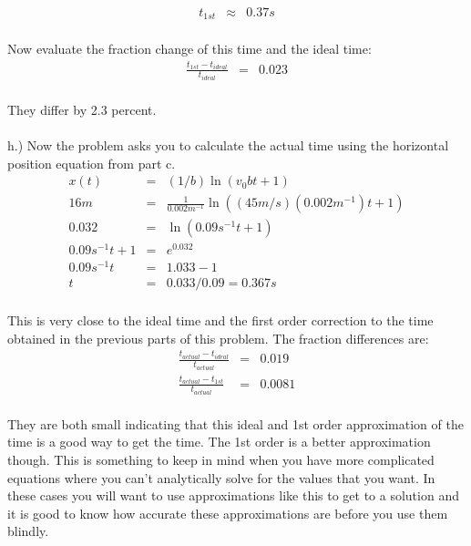 \documentclass[11pt]{amsart}
\begin{document}
\begin{eqnarray*}
t_{1st} &\approx& 0.37 s 
\end{eqnarray*} \\ 
Now evaluate the fraction change of this time and the ideal time: \\ 
\begin{eqnarray*}
\frac{t_{1st}-t_{ideal}}{t_{ideal}} &=& 0.023 
\end{eqnarray*} \\
They differ by 2.3 percent. \\ \\
h.) Now the problem asks you to calculate the actual time using the horizontal position equation from part c. \\ 
\begin{eqnarray*} 
x(t) &=& (1/b) \ln(v_{0}bt+1) \\
16m &=& \frac{1}{0.002m^{-1}}\ln((45m/s)(0.002m^{-1})t+1) \\
0.032 &=&  \ln(0.09s^{-1}t+1) \\
0.09s^{-1}t+1 &=& e^{0.032} \\
0.09s^{-1}t &=& 1.033 - 1 \\
t &=& 0.033/0.09 = 0.367s
\end{eqnarray*} \\
This is very close to the ideal time and the first order correction to the time obtained in the previous parts of this problem. The fraction differences are: \\ 
\begin{eqnarray*}
\frac{t_{actual}-t_{ideal}}{t_{actual}} &=& 0.019 \\
\frac{t_{actual}-t_{1st}}{t_{actual}} &=& 0.0081 
\end{eqnarray*} \\
They are both small indicating that this ideal and 1st order approximation of the time is a good way to get the time. The 1st order is a better approximation though. This is something to keep in mind when you have more complicated equations where you can't analytically solve for the values that you want. In these cases you will want to use approximations like this to get to a solution and it is good to know how accurate these approximations are before you use them blindly. \\  \\
\end{document}
